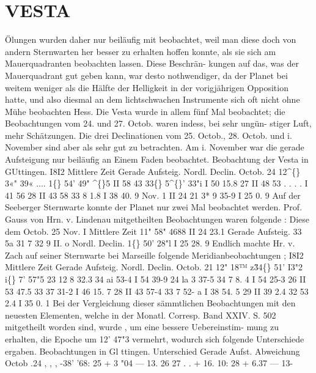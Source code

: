 \documentclass[12pt,a4paper]{article}
\newcommand{\degree}{\textdegree}
\begin{document}
\section*{VESTA}
Ölungen  wurden  daher  nur  beiläufig  mit  beobachtet,  weil  man  diese  doch  von  andern  Sternwarten  her 
besser  zu  erhalten  hoffen  konnte,  als  sie  sich  am  Mauerquadranten  beobachten  lassen.  Diese  Beschrän- 
kungen auf  das,  was  der  Mauerquadrant  gut  geben  kann,  war  desto  nothwendiger,  da  der  Planet  bei 
weitem  weniger  als  die  Hälfte  der  Helligkeit  in  der  vorigjährigen  Opposition  hatte,  und  also  diesmal 
an  dem  lichtschwachen  Instrumente  sich  oft  nicht  ohne  Mühe  beobachten  Hess.  Die  Vesta  wurde  in 
allem  fünf  Mal  beobachtet;  die  Beobachtungen  vom  24.  und  27.  Octob.  waren  indess,  bei  sehr  ungün- 
stiger Luft,  mehr  Schätzungen.  Die  drei  Declinationen  vom  25.  Octob.,  28.  Octob.  und  i.  November  sind 
aber  als  sehr  gut  zu  betrachten.  Am  i.  November  war  die  gerade  Aufsteigung  nur  beiläufig  an  Einem 
Faden  beobachtet. 
Beobachtung  der    Vesta  in  GUttingen. 
I8I2 
Mittlere  Zeit 
Gerade  Aufsteig. 
Nordl.  Declin. 
Octob.  24 
12\textasciicircum\{\}     3«"  39« 
.... 
1\degree\{\}  54'    49" 
\textasciicircum\{\}5 
II     58     43 
33\degree\{\}  5\textasciicircum\{\}'    33"i 
I     50     15.8 
27 
II     48     53 
.      .      .      . 
I     41     56 
28 
II     43     58 
33       8       1.8 
I     38     40. 9 
Nov.      1 
II     24     21 
3*      9     35-9 
I     25      0. 9 
Auf  der  Seeberger  Sternwarte  konnte  der  Planet  nur  zwei  Mal  beobachtet  werden. 
Prof.  Gauss  von  Hrn.  v.  Lindenau  mitgetheilten  Beobachtungen  waren  folgende : 
Diese  dem 
Octob.  25 
Nov.      I 
Mittlere  Zeit 
11"  58"  4688 
II     24    23.1 
Gerade  Aufsteig. 
33     5a     31  7 
32        9      II. o 
Nordl.  Declin. 
1\degree\{\}    50'    28"l 
I     25     28. 9 
Endlich  machte  Hr.  v.  Zach  auf  seiner  Sternwarte  bei  Marseille  folgende  Meridianbeobachtungen ; 
I8I2 
Mittlere  Zeit 
Gerade  Aufsteig. 
Nordl.  Declin. 
Octob.  21 
12"  18™  z\H 
34\degree\{\}    51'      I3"2 
i\degree\{\}     7'    57"5 
23 
12      8     32.3 
34     ai     53-4 
I     54     39-9 
24 
la       3     37-5 
34      7       8. 4 
I     54     25-3 
26 
II     53     47.5 
33     37     31-2 
I     46     15. 7 
28 
II     43     57-4 
33       7     52- a 
I     38     54. 5 
29 
II     39       2.4 
32     53       2.4 
I     35       0. 1 
Bei  der  Vergleichung  dieser  sämmtlichen  Beobachtungen  mit  den  neuesten  Elementen,  welche  in 
der  Monatl.  Corresp.  Band  XXIV.  S.  502  mitgetheilt  worden  sind,  wurde ,  um  eine  bessere  Uebereinstim- 
mung  zu  erhalten,  die  Epoche  um  12'  47"3  vermehrt,  wodurch  sich  folgende  Unterschiede  ergaben. 
Beobachtungen  in  Gl ttingen. 
Unterschied 
Gerade  Aufst. 
Abweichung 
Octob 
.24 
, 
,    , 
-38' 
'68: 
25 
+ 
3  "04 
---  13. 
26 
27 
.    . 
+  16. 
10: 
28 
+ 
6.37 
---  13- 
\end{document}

